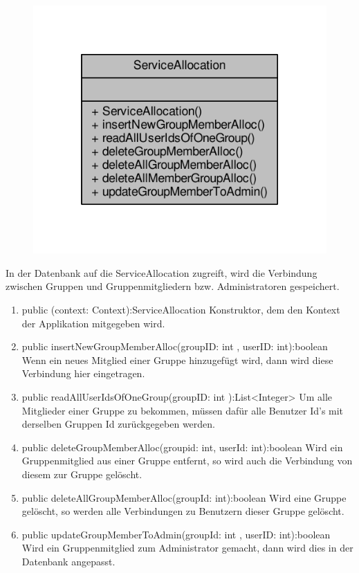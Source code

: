 \begin{figure}[H]
	\includegraphics[scale = 1]{res/umlClasses/service_allocation__coll__graph.pdf} 
	\centering
\end{figure}
In der Datenbank auf die ServiceAllocation zugreift, wird die Verbindung zwischen Gruppen und Gruppenmitgliedern bzw. Administratoren gespeichert. 
\begin{enumerate}
	\item public (context: Context):ServiceAllocation
		Konstruktor, dem den Kontext der Applikation mitgegeben wird.
	\item public insertNewGroupMemberAlloc(groupID: int , userID: int):boolean
		Wenn ein neues Mitglied einer Gruppe hinzugefügt wird, dann wird diese Verbindung hier eingetragen.
	\item public readAllUserIdsOfOneGroup(groupID: int ):List<Integer> 
		Um alle Mitglieder einer Gruppe zu bekommen, müssen dafür alle Benutzer Id's mit derselben Gruppen Id zurückgegeben werden.
	\item public deleteGroupMemberAlloc(groupid: int, userId: int):boolean 
		Wird ein Gruppenmitglied aus einer Gruppe entfernt, so wird auch die Verbindung von diesem zur Gruppe gelöscht.
	\item public deleteAllGroupMemberAlloc(groupId: int):boolean 
		Wird eine Gruppe gelöscht, so werden alle Verbindungen zu Benutzern dieser Gruppe gelöscht.
	\item public updateGroupMemberToAdmin(groupId: int , userID: int):boolean 
		Wird ein Gruppenmitglied zum Administrator gemacht, dann wird dies in der Datenbank angepasst.
\end{enumerate}

